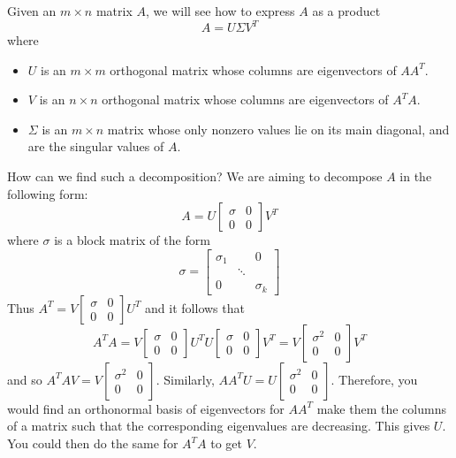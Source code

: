 \documentclass{ximera}
\begin{document}
Given an $m\times n$ matrix $A$, we will see how to express $A$ as a product
\[ A=U\Sigma V^T\]
where
\begin{itemize}
\item $U$ is an $m\times m$ orthogonal matrix whose columns are
eigenvectors of $AA^T$.
\item $V$ is an $n\times n$ orthogonal matrix whose columns are
eigenvectors of $A^TA$.
\item $\Sigma$ is an $m\times n$ matrix whose only nonzero values
lie on its main diagonal, and are the singular values of $A$.
\end{itemize}
How can we find such a decomposition? We are aiming to decompose $A$ in the following form:
\begin{equation*}
A=U\left[
\begin{array}{cc}
\sigma & 0 \\
0 & 0
\end{array}
\right] V^T
\end{equation*}
where $\sigma $ is a block matrix of the form
\[
\sigma =\left[
\begin{array}{ccc}
\sigma _{1} &  & 0 \\
& \ddots &  \\
0 &  & \sigma _{k}
\end{array}
\right]
\]
Thus $A^T=V\left[
\begin{array}{cc}
\sigma & 0 \\
0 & 0
\end{array}
\right] U^T$ and it follows that
\begin{equation*}
A^TA=V\left[
\begin{array}{cc}
\sigma & 0 \\
0 & 0
\end{array}
\right] U^TU\left[
\begin{array}{cc}
\sigma & 0 \\
0 & 0
\end{array}
\right] V^T=V\left[
\begin{array}{cc}
\sigma ^{2} & 0 \\
0 & 0
\end{array}
\right] V^T
\end{equation*}
and so $A^TAV=V\left[
\begin{array}{cc}
\sigma ^{2} & 0 \\
0 & 0
\end{array}
\right] .$ Similarly, $AA^TU=U\left[
\begin{array}{cc}
\sigma ^{2} & 0 \\
0 & 0
\end{array}
\right] .$ Therefore, you would find an orthonormal basis of eigenvectors
for $AA^T$ make them the columns of a matrix such that the
corresponding eigenvalues are decreasing. This gives $U.$ You could then do
the same for $A^TA$ to get $V$.
\end{document}
